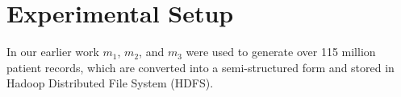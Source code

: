 
\section*{Experimental Setup}
\label{experimentalSetup}


In our earlier work \cite{Satti2020} $m_1$, $m_2$, and $m_3$ were used to generate over 115 million patient records, which are converted into a semi-structured form and stored in Hadoop Distributed File System (HDFS).